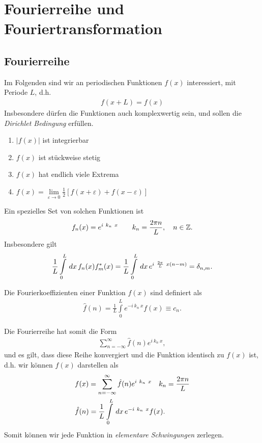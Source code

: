 \section{Fourierreihe und Fouriertransformation}
\subsection{Fourierreihe}
Im Folgenden sind wir an periodischen Funktionen $f(x)$ interessiert, mit
Periode $L$, d.h.
\begin{align*}
f(x + L) = f(x)
\end{align*}
Insbesondere dürfen die Funktionen auch komplexwertig sein, und sollen die {\em
Dirichlet Bedingung} erfüllen.
\begin{enumerate}
  \item $|f(x)|$ ist integrierbar
  \item $f(x)$ ist stückweise stetig
  \item $f(x)$ hat endlich viele Extrema
  \item $f(x) = \lim \limits_{\varepsilon\to0}
  \frac{1}{2}\left[f(x+\varepsilon) + f(x-\varepsilon)\right]$
\end{enumerate}
Ein spezielles Set von solchen Funktionen ist
\begin{align*}
f_n(x) = e^{i\ k_n\ x}\qquad k_n = \frac{2\pi n}{L},\quad n\in\mathbb{Z}.
\end{align*}
Insbesondere gilt
\begin{align*}
\frac{1}{L} \int \limits_{0}^{L} \,dx\, f_n(x) f_m^*(x) = \frac{1}{L} \int
\limits_{0}^{L} \,dx\, e^{i\ \frac{2\pi}{L}\ x(n-m)} = \delta_{n,m}.
\end{align*}
\begin{Definition}[Fourierkoeffizienten]
Die Fourierkoeffizienten einer Funktion $f(x)$ sind definiert als
\begin{align*}
\hat{f}(n) = \frac{1}{L} \int \limits_{0}^{L} e^{-i\ k_n\ x} f(x) \equiv c_n.
\end{align*}
\end{Definition}
\begin{Definition}[Fourierreihe]
Die Fourierreihe hat somit die Form
\begin{align*}
\sum \limits_{n = -\infty}^{\infty} \hat{f}(n) e^{i\ k_n\ x},
\end{align*}
und es gilt, dass diese Reihe konvergiert und die Funktion identisch zu $f(x)$
ist, d.h. wir können $f(x)$ darstellen als
\begin{align*}
&f(x) = \sum \limits_{n = -\infty}^{\infty} \hat{f}(n) e^{i\ k_n\ x}\quad k_n
= \frac{2\pi n}{L}\\
&\hat{f}(n) = \frac{1}{L} \int \limits_{0}^{L} \dx e^{-i\ k_n\ x} f(x).
\end{align*}
Somit können wir jede Funktion in {\em elementare Schwingungen} zerlegen. 
\end{Definition}
